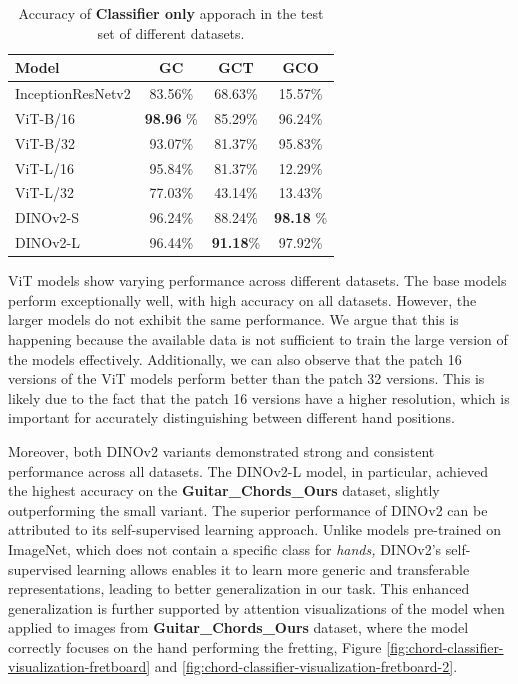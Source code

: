 \documentclass[10pt,twocolumn,letterpaper]{article}
\begin{document}
\begin{table}[h]
    \centering
    \begin{tabular}{lccc}
        \toprule
        \textbf{Model}    & \textbf{GC}       & \textbf{GCT}     & \textbf{GCO}      \\
        \midrule
        InceptionResNetv2 & 83.56\%           & 68.63\%          & 15.57\%           \\
        \midrule
        ViT-B/16          & \textbf{98.96} \% & 85.29\%          & 96.24\%           \\
        ViT-B/32          & 93.07\%           & 81.37\%          & 95.83\%           \\
        ViT-L/16          & 95.84\%           & 81.37\%          & 12.29\%           \\
        ViT-L/32          & 77.03\%           & 43.14\%          & 13.43\%           \\
        DINOv2-S          & 96.24\%           & 88.24\%          & \textbf{98.18} \% \\
        DINOv2-L          & 96.44\%           & \textbf{91.18}\% & 97.92\%           \\
        \bottomrule
    \end{tabular}
    \caption{Accuracy of \textbf{Classifier only} apporach in the test set of different datasets.}
    \label{tab:transformer-models-results}
\end{table}

ViT models show varying performance across different datasets. The base models perform exceptionally well, with high accuracy on all datasets. However, the larger models do not exhibit the same performance. We argue that this is happening because the available data is not sufficient to train the large version of the models effectively. Additionally, we can also observe that the patch 16 versions of the ViT models perform better than the patch 32 versions. This is likely due to the fact that the patch 16 versions have a higher resolution, which is important for accurately distinguishing between different hand positions.

Moreover, both DINOv2 variants demonstrated strong and consistent performance across all datasets. The DINOv2-L model, in particular, achieved the highest accuracy on the \textbf{Guitar\_Chords\_Ours} dataset, slightly outperforming the small variant. The superior performance of DINOv2 can be attributed to its self-supervised learning approach. Unlike models pre-trained on ImageNet, which does not contain a specific class for \emph{hands,} DINOv2's self-supervised learning allows enables it to learn more generic and transferable representations, leading to better generalization in our task. This enhanced generalization is further supported by attention visualizations of the model when applied to images from \textbf{Guitar\_Chords\_Ours} dataset, where the model correctly focuses on the hand performing the fretting, Figure \ref{fig:chord-classifier-visualization-fretboard} and \ref{fig:chord-classifier-visualization-fretboard-2}. 
\end{document}
